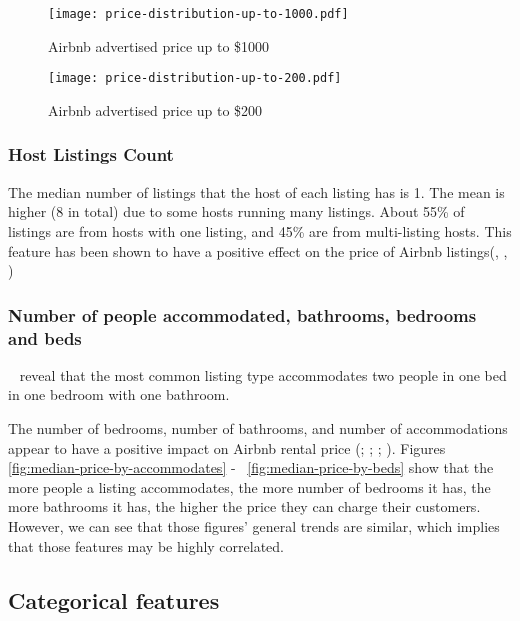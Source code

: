 \begin{figure}[!htbp] \centering
    \texttt{[image: price-distribution-up-to-1000.pdf]}
        \caption{Airbnb advertised price up to \$1000}
        \label{fig:price-distribution-1000}
\end{figure}

\begin{figure}[!htbp] \centering
    \texttt{[image: price-distribution-up-to-200.pdf]}
        \caption{Airbnb advertised price up to \$200}
        \label{fig:price-distribution-200}
\end{figure}

\subsubsection*{Host Listings Count}

The median number of listings that the host of each listing has is 1. The mean
is higher (8 in total) due to some hosts running many listings. About 55\% of
listings are from hosts with one listing, and 45\% are from multi-listing hosts.
This feature has been shown to have a positive effect on the price of Airbnb
listings(\cite{chen2017consumer}, \cite{ert2016trust}, \cite{wang2017price})

\subsubsection*{Number of people accommodated, bathrooms, bedrooms and beds}

~
  reveal that the most common listing type accommodates two people in one bed
  in one
bedroom with one bathroom.

The number of bedrooms, number of bathrooms, and number of accommodations appear
to have a positive impact on Airbnb rental price (\cite{ert2016trust};
\cite{chen2017consumer}; \cite{wang2017price}; \cite{gibbs2018use}). Figures
\ref{fig:median-price-by-accommodates} - ~\ref{fig:median-price-by-beds} show that the more people a listing
accommodates, the more number of bedrooms it has, the more bathrooms it has, the
higher the price they can charge their customers. However, we can see that those
figures' general trends are similar, which implies that those features may be
highly correlated.

\subsection{Categorical features}
\label{sec:categorical_features}

